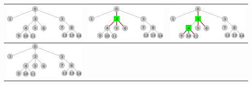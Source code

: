 \begin{center}
\begin{tabular}{ |c||c||c| }
			\hline
			\includegraphics[scale = 0.3]{img/ej3/constructiva_golosa/tree_st0.png} &
			\includegraphics[scale = 0.3]{img/ej3/constructiva_golosa/tree_st01.png} &
			\includegraphics[scale = 0.3]{img/ej3/constructiva_golosa/tree_st02.png} \\
			\hline
			\includegraphics[scale = 0.3]{img/ej3/constructiva_golosa/tree_st0.png} &

\end{tabular}
\end{center}
